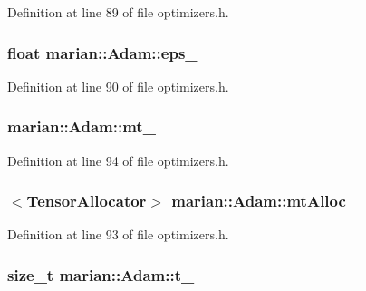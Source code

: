Definition at line 89 of file optimizers.\+h.

\subsubsection[{\texorpdfstring{eps\+\_\+}{eps_}}]{\setlength{\rightskip}{0pt plus 5cm}float marian\+::\+Adam\+::eps\+\_\+\hspace{0.3cm}{\ttfamily [private]}}\hypertarget{classmarian_1_1Adam_a95c21e42ab91a2b6631702a470a1af81}{}\label{classmarian_1_1Adam_a95c21e42ab91a2b6631702a470a1af81}


Definition at line 90 of file optimizers.\+h.

\subsubsection[{\texorpdfstring{mt\+\_\+}{mt_}}]{ marian\+::\+Adam\+::mt\+\_\+\hspace{0.3cm}{\ttfamily [private]}}\hypertarget{classmarian_1_1Adam_a5af2c6b526ebd34160a6c253ff03ac75}{}\label{classmarian_1_1Adam_a5af2c6b526ebd34160a6c253ff03ac75}


Definition at line 94 of file optimizers.\+h.

\subsubsection[{\texorpdfstring{mt\+Alloc\+\_\+}{mtAlloc_}}]{$<${\bf Tensor\+Allocator}$>$ marian\+::\+Adam\+::mt\+Alloc\+\_\+\hspace{0.3cm}{\ttfamily [private]}}\hypertarget{classmarian_1_1Adam_a148b6411057a10ca625e4cff3c9f893c}{}\label{classmarian_1_1Adam_a148b6411057a10ca625e4cff3c9f893c}


Definition at line 93 of file optimizers.\+h.

\subsubsection[{\texorpdfstring{t\+\_\+}{t_}}]{\setlength{\rightskip}{0pt plus 5cm}size\+\_\+t marian\+::\+Adam\+::t\+\_\+\hspace{0.3cm}{\ttfamily [private]}}\hypertarget{classmarian_1_1Adam_ad51e47f4b687f5df04dedb1222559e9d}{}\label{classmarian_1_1Adam_ad51e47f4b687f5df04dedb1222559e9d}


